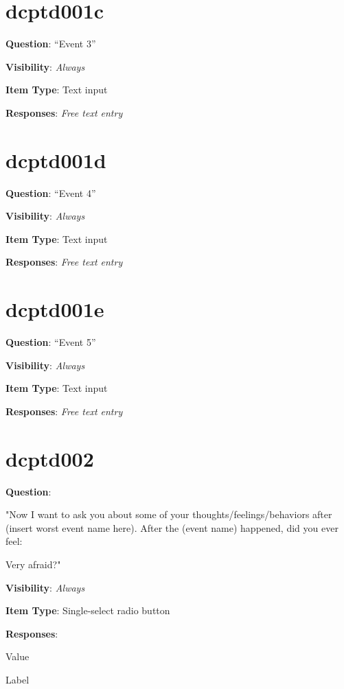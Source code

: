\documentclass[]{book}
\begin{document}
\hypertarget{dcptd001c}{%
\section{dcptd001c}\label{dcptd001c}}

\textbf{Question}: ``Event 3''

\textbf{Visibility}: \emph{Always}

\textbf{Item Type}: Text input

\textbf{Responses}: \emph{Free text entry}

\hypertarget{dcptd001d}{%
\section{dcptd001d}\label{dcptd001d}}

\textbf{Question}: ``Event 4''

\textbf{Visibility}: \emph{Always}

\textbf{Item Type}: Text input

\textbf{Responses}: \emph{Free text entry}

\hypertarget{dcptd001e}{%
\section{dcptd001e}\label{dcptd001e}}

\textbf{Question}: ``Event 5''

\textbf{Visibility}: \emph{Always}

\textbf{Item Type}: Text input

\textbf{Responses}: \emph{Free text entry}

\hypertarget{dcptd002}{%
\section{dcptd002}\label{dcptd002}}

\textbf{Question}:

"Now I want to ask you about some of your thoughts/feelings/behaviors after (insert worst event name here). After the (event name) happened, did you ever feel:

Very afraid?"

\textbf{Visibility}: \emph{Always}

\textbf{Item Type}: Single-select radio button

\textbf{Responses}:

Value

Label
\end{document}
